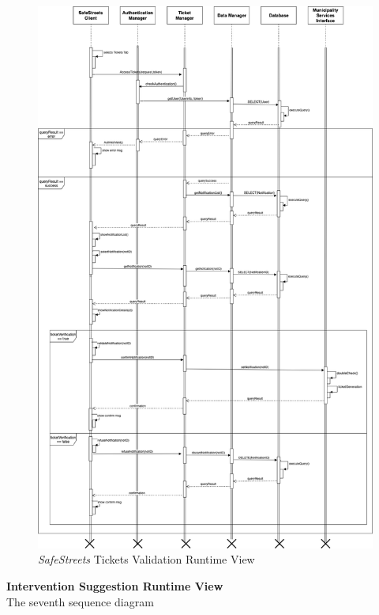 \documentclass{article}
\begin{document}
	\begin{figure}[H]
			\centering
			\includegraphics[scale=0.25]{Images/Diagrams/Runtime/tickets_runtime.png}
			\caption{{\it SafeStreets} Tickets Validation Runtime View}
	\end{figure}
	\pagebreak
	\noindent	
	{\bf Intervention Suggestion Runtime View} \\
	The seventh sequence diagram \\
\end{document}
